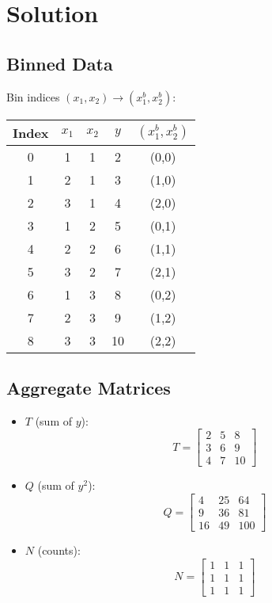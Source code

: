 \documentclass{article}
\begin{document}
\section*{Solution}

\subsection*{Binned Data}
Bin indices $(x_1, x_2) \to (x_1^b, x_2^b)$:

\begin{center}
\begin{tabular}{ccccc}
\toprule
Index & $x_1$ & $x_2$ & $y$ & $(x_1^b, x_2^b)$ \\
\midrule
0 & 1 & 1 & 2 & (0,0) \\
1 & 2 & 1 & 3 & (1,0) \\
2 & 3 & 1 & 4 & (2,0) \\
3 & 1 & 2 & 5 & (0,1) \\
4 & 2 & 2 & 6 & (1,1) \\
5 & 3 & 2 & 7 & (2,1) \\
6 & 1 & 3 & 8 & (0,2) \\
7 & 2 & 3 & 9 & (1,2) \\
8 & 3 & 3 & 10 & (2,2) \\
\bottomrule
\end{tabular}
\end{center}

\subsection*{Aggregate Matrices}

\begin{itemize}
    \item $T$ (sum of $y$):
    \[ T = \begin{bmatrix} 2 & 5 & 8 \\ 3 & 6 & 9 \\ 4 & 7 & 10 \end{bmatrix} \]

    \item $Q$ (sum of $y^2$):
    \[ Q = \begin{bmatrix} 4 & 25 & 64 \\ 9 & 36 & 81 \\ 16 & 49 & 100 \end{bmatrix} \]

    \item $N$ (counts):
    \[ N = \begin{bmatrix} 1 & 1 & 1 \\ 1 & 1 & 1 \\ 1 & 1 & 1 \end{bmatrix} \]
\end{itemize}
\end{document}
